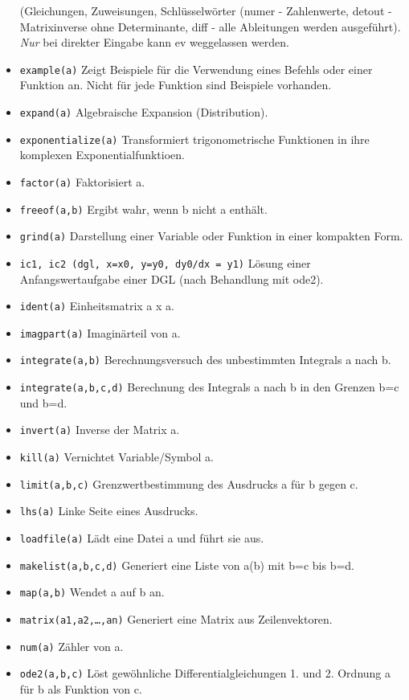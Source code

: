 \documentclass[ngerman,12pt]{scrartcl}
\begin{document}
\begin{itemize}
  (Gleichungen, Zuweisungen, Schlüsselwörter (numer - Zahlenwerte,
  detout - Matrixinverse ohne Determinante, diff - alle Ableitungen
  werden ausgeführt). \emph{Nur} bei  direkter Eingabe kann ev weggelassen werden.
\item \texttt{example(a)} Zeigt Beispiele für die Verwendung eines
  Befehls oder einer  Funktion an. Nicht für jede Funktion sind Beispiele vorhanden.
\item \texttt{expand(a)} Algebraische Expansion (Distribution).
\item \texttt{exponentialize(a)} Transformiert trigonometrische Funktionen in ihre komplexen Exponentialfunktioen.
\item \texttt{factor(a)} Faktorisiert a.
\item \texttt{freeof(a,b)} Ergibt wahr, wenn b nicht a enthält.
\item \texttt{grind(a)} Darstellung einer Variable oder Funktion in einer kompakten Form.
\item \texttt{ic1, ic2 (dgl, x=x0, y=y0, dy0/dx = y1)} Lösung einer Anfangswertaufgabe einer DGL (nach Behandlung mit ode2).
\item \texttt{ident(a)} Einheitsmatrix a x a.
\item \texttt{imagpart(a)} Imaginärteil von a.
\item \texttt{integrate(a,b)} Berechnungsversuch des unbestimmten Integrals a nach b.
\item \texttt{integrate(a,b,c,d)} Berechnung des Integrals a nach b in den Grenzen b=c und b=d.
\item \texttt{invert(a)} Inverse der Matrix a.
\item \texttt{kill(a)} Vernichtet Variable/Symbol a.
\item \texttt{limit(a,b,c)} Grenzwertbestimmung des Ausdrucks a für b gegen c.
\item \texttt{lhs(a)} Linke Seite eines Ausdrucks.
\item \texttt{loadfile(a)} Lädt eine Datei a und führt sie aus.
\item \texttt{makelist(a,b,c,d)} Generiert eine Liste von a(b) mit  b=c
  bis  b=d.
\item \texttt{map(a,b)} Wendet a auf b an.
\item \texttt{matrix(a1,a2,\ldots,an)} Generiert eine Matrix aus  Zeilenvektoren.
\item \texttt{num(a)} Zähler von a.
\item \texttt{ode2(a,b,c)} Löst gewöhnliche Differentialgleichungen 1.
  und  2. Ordnung a für b als Funktion von c.

\end{itemize}
\end{document}
